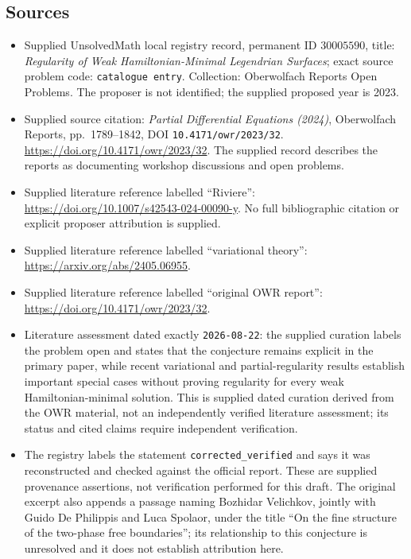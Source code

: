 \documentclass[11pt]{article}
\begin{document}
\subsection{Sources}
\begin{itemize}
\item Supplied UnsolvedMath local registry record, permanent ID \(30005590\), title: \emph{Regularity of Weak Hamiltonian-Minimal Legendrian Surfaces}; exact source problem code: \texttt{catalogue entry}. Collection: Oberwolfach Reports Open Problems. The proposer is not identified; the supplied proposed year is 2023.
\item Supplied source citation: \emph{Partial Differential Equations (2024)}, Oberwolfach Reports, pp.~1789--1842, DOI \texttt{10.4171/owr/2023/32}. \url{https://doi.org/10.4171/owr/2023/32}. The supplied record describes the reports as documenting workshop discussions and open problems.
\item Supplied literature reference labelled ``Riviere'': \url{https://doi.org/10.1007/s42543-024-00090-y}. No full bibliographic citation or explicit proposer attribution is supplied.
\item Supplied literature reference labelled ``variational theory'': \url{https://arxiv.org/abs/2405.06955}.
\item Supplied literature reference labelled ``original OWR report'': \url{https://doi.org/10.4171/owr/2023/32}.
\item Literature assessment dated exactly \texttt{2026-08-22}: the supplied curation labels the problem open and states that the conjecture remains explicit in the primary paper, while recent variational and partial-regularity results establish important special cases without proving regularity for every weak Hamiltonian-minimal solution. This is supplied dated curation derived from the OWR material, not an independently verified literature assessment; its status and cited claims require independent verification.
\item The registry labels the statement \texttt{corrected\_verified} and says it was reconstructed and checked against the official report. These are supplied provenance assertions, not verification performed for this draft. The original excerpt also appends a passage naming Bozhidar Velichkov, jointly with Guido De Philippis and Luca Spolaor, under the title ``On the fine structure of the two-phase free boundaries''; its relationship to this conjecture is unresolved and it does not establish attribution here.
\end{itemize}
\end{document}
